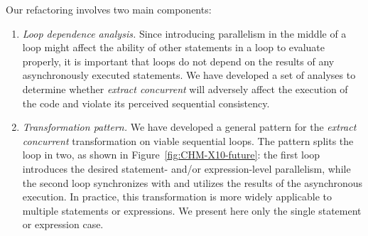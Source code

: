 Our refactoring involves two main components:
\begin{enumerate}
\item {\em Loop dependence analysis.} Since introducing parallelism in
the middle of a loop might affect the ability of other statements in a
loop to evaluate properly, it is important that loops do not depend
on the results of any asynchronously executed statements. We
have developed a set of analyses to determine whether {\em extract
concurrent} will adversely affect the execution of the code and
violate its perceived sequential consistency.

\item {\em Transformation pattern.} We have developed a general
pattern for the {\em extract concurrent} transformation on viable
sequential loops.
The pattern splits the loop in two, as shown in Figure~\ref{fig:CHM-X10-future}: the
first loop introduces the desired statement- and/or expression-level
parallelism, while the second loop synchronizes with and utilizes the
results of the asynchronous execution.
In practice, this
 transformation is more widely applicable to multiple statements or expressions.
We present here only the single statement or expression case.
\end{enumerate}


